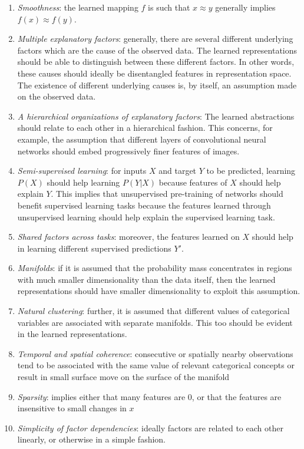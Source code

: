 \begin{enumerate}
		\item \textit{Smoothness}: the learned mapping $ f  $ is such that $ x \approx y  $ generally implies
				$ f(x) \approx f (y)  $.
		\item \textit{Multiple explanatory factors}: generally, there are several different underlying factors
				which are the cause of the observed data. The learned representations should be able
				to distinguish between these different factors. In other words,
				these causes should ideally be disentangled features in representation space.
				The existence of different underlying causes is, by itself, an assumption made on the observed data.
		\item \textit{A hierarchical organizations of explanatory factors}: The learned abstractions should relate
				to each other in a hierarchical fashion. This concerns, for example, the assumption that different
				layers of convolutional neural networks should embed progressively finer features of images.
		\item \textit{Semi-supervised learning}: for inputs $ X  $ and target $ Y  $ to be predicted,
				learning $ P (X)  $ should help learning $ P (Y|X)  $ because
				features of $ X  $ should help explain $ Y  $. This implies that unsupervised pre-training
				of networks should benefit supervised learning tasks because the features learned through unsupervised
				learning should help explain the supervised learning task.
		\item \textit{Shared factors across tasks}: moreover, the features learned on $ X  $ should
				help in learning different supervised predictions $ Y'  $.
		\item \textit{Manifolds}: if it is assumed that the probability mass concentrates
				in regions with much smaller dimensionality than the data itself,
				then the learned representations should have smaller dimensionality 
				to exploit this assumption.
		\item \textit{Natural clustering}: further, it is assumed that different values of categorical variables
				are associated with separate manifolds. This too should be evident in the learned representations.
		\item \textit{Temporal and spatial coherence}:
				consecutive or spatially nearby observations
				tend to be associated with the same value of relevant categorical
				concepts or result in small surface move on the surface of the manifold
		\item \textit{Sparsity}: implies either that many features are 0, or 
				that the features are insensitive to small changes in $ x  $
		\item \textit{Simplicity of factor dependencies}: ideally factors are related
				to each other linearly, or otherwise in a simple fashion.
\end{enumerate} 


